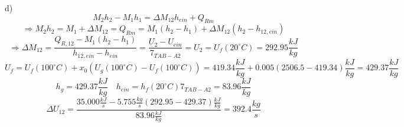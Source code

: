 d) \\
\[
M_2 h_2 - M_1 h_1 = \Delta M_{12} h_{ein} + Q_{Rm}
\]
\[
\Rightarrow M_2 h_2 = M_1 + \Delta M_{12} = Q_{Rm} = M_1 (h_2 - h_1) + \Delta M_{12} (h_2 - h_{12,ein})
\]
\[
\Rightarrow \Delta M_{12} = \frac{Q_{R,12} - M_1 (h_2 - h_1)}{h_{12,ein} - h_{ein}} = \frac{U_2 - U_{ein}}{7_{TAB-A2}} = U_2 = U_f (20^\circ C) = 292.95 \frac{kJ}{kg}
\]
\[
U_f = U_f (100^\circ C) + x_0 (U_g (100^\circ C) - U_f (100^\circ C)) = 419.34 \frac{kJ}{kg} + 0.005 (2506.5 - 419.34) \frac{kJ}{kg} = 429.37 \frac{kJ}{kg}
\]
\[
h_g = 429.37 \frac{kJ}{kg} \quad h_{ein} = h_f (20^\circ C) 7_{TAB-A2} = 83.96 \frac{kJ}{kg}
\]
\[
\Delta U_{12} = \frac{35.000 \frac{kJ}{s} - 5.755 \frac{kg}{s} (292.95 - 429.37) \frac{kJ}{kg}}{83.96 \frac{kJ}{kg}} = 392.4 \frac{kg}{s}
\]